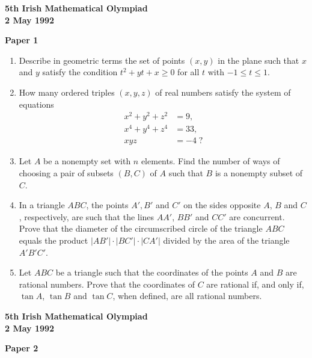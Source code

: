 \documentclass[12pt]{article}
\begin{document}
\begin{center}
{\large\bfseries 5th Irish Mathematical Olympiad\\
2 May 1992}
\end{center}

\bigskip
\noindent\textbf{Paper 1}
\bigskip

\begin{enumerate}
\item Describe in geometric terms the set of points $(x,y)$ in the plane such that $x$ and $y$ satisfy the condition $t^2 + yt + x \ge 0$ for all $t$ with $-1 \le t \le 1$.

\item How many ordered triples $(x,y,z)$ of real numbers satisfy the system of equations \begin{align*} x^2 + y^2 + z^2 &= 9, \\ x^4 + y^4 + z^4 &= 33, \\ xyz &= -4\;? \end{align*}

\item Let $A$ be a nonempty set with $n$ elements. Find the number of ways of choosing a pair of subsets $(B, C)$ of $A$ such that $B$ is a nonempty subset of $C$.

\item In a triangle $ABC$, the points $A', B'$ and $C'$ on the sides opposite $A$, $B$ and $C$, respectively, are such that the lines $AA'$, $BB'$ and $CC'$ are concurrent. Prove that the diameter of the circumscribed circle of the triangle $ABC$ equals the product $|AB'|\cdot|BC'|\cdot|CA'|$ divided by the area of the triangle $A'B'C'$.

\item Let $ABC$ be a triangle such that the coordinates of the points $A$ and $B$ are rational numbers. Prove that the coordinates of $C$ are rational if, and only if, $\tan A$, $\tan B$ and $\tan C$, when defined, are all rational numbers.

\end{enumerate}

\newpage

\begin{center}
{\large\bfseries 5th Irish Mathematical Olympiad\\
2 May 1992}
\end{center}

\bigskip
\noindent\textbf{Paper 2}
\bigskip
\end{document}
